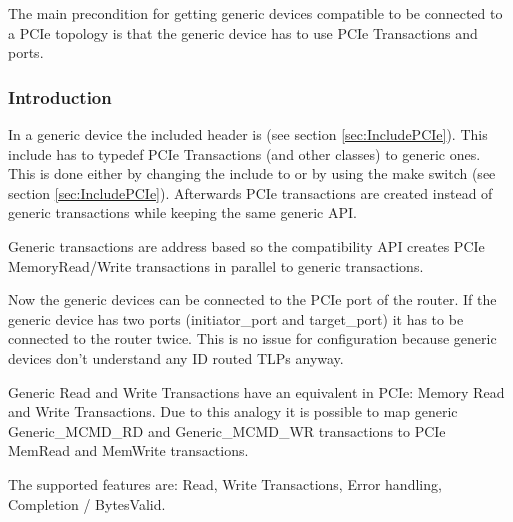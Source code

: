 The main precondition for getting generic devices compatible to be connected to a PCIe topology is that the generic device has to use PCIe Transactions and ports.

\subsubsection{Introduction}
In a generic device the included header is  (see section \ref{sec:IncludePCIe}). This include has to typedef PCIe Transactions (and other classes) to generic ones. This is done either by changing the include to  or by using the make switch (see section \ref{sec:IncludePCIe}). Afterwards PCIe transactions are created instead of generic transactions while keeping the same generic API. 

Generic transactions are address based so the compatibility API creates PCIe MemoryRead/Write transactions in parallel to generic transactions. 


Now the generic devices can be connected to the PCIe port of the router. If the generic device has two ports (initiator\_port and target\_port) it has to be connected to the router twice. This is no issue for configuration because generic devices don't understand any ID routed TLPs anyway.

Generic Read and Write Transactions have an equivalent in PCIe: Memory Read and Write Transactions. Due to this analogy it is possible to map generic Generic\_MCMD\_RD and Generic\_MCMD\_WR transactions to PCIe MemRead and MemWrite transactions.


The supported features are: Read, Write Transactions, Error handling, Completion / BytesValid.

